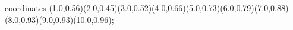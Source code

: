 					coordinates { (1.0,0.56)(2.0,0.45)(3.0,0.52)(4.0,0.66)(5.0,0.73)(6.0,0.79)(7.0,0.88)(8.0,0.93)(9.0,0.93)(10.0,0.96)};